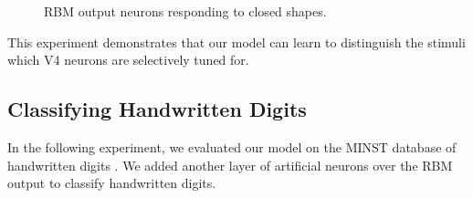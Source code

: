 \documentclass[conference]{IEEEtran}
\begin{document}
\begin{figure}[htp]
\centering
{}\hfil
{}\hfil
{}
\caption{RBM output neurons responding to closed shapes.}
\label{fig:10}
\end{figure}

This experiment demonstrates that our model can learn to distinguish the stimuli
which V4 neurons are selectively tuned for.

\subsection{Classifying Handwritten Digits}

In the following experiment,
we evaluated our model on the MINST database of handwritten digits \cite{lecun1998}.
We added another layer of artificial neurons over the RBM output
to classify handwritten digits.
\end{document}

